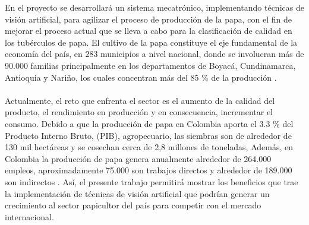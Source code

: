 En el proyecto se desarrollará un sistema mecatrónico, implementando técnicas de visión artificial, para agilizar el proceso de producción de la papa, con el fin de mejorar el proceso actual que se lleva a cabo para la clasificación de calidad en los tubérculos de papa. El cultivo de la papa constituye el eje fundamental de la economía del país, en 283 municipios a nivel nacional, donde se involucran más de 90.000 familias principalmente en los departamentos de Boyacá, Cundinamarca, Antioquia y Nariño, los cuales concentran más del 85 \% de la producción \cite{referencia1}.
\\
\\
Actualmente, el reto que enfrenta el sector es el aumento de la calidad del producto, el rendimiento en producción y en consecuencia, incrementar el consumo. Debido a que la producción de papa en Colombia aporta el 3.3 \% del Producto Interno Bruto, (PIB), agropecuario, las siembras son de alrededor de 130 mil hectáreas y se cosechan cerca de 2,8 millones de toneladas, Además, en Colombia la producción de papa genera anualmente alrededor de 264.000 empleos, aproximadamente 75.000 son trabajos directos y alrededor de 189.000 son indirectos \cite{referencia2}.
Así, el presente trabajo permitirá mostrar los beneficios que trae la implementación de técnicas de visión artificial que podrían generar un  crecimiento al sector papicultor del país para competir con el mercado internacional.


